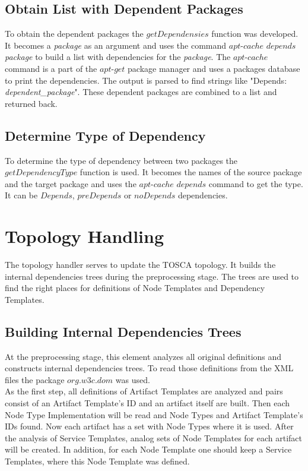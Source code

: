 \subsection*{Obtain List with Dependent Packages}
To obtain the dependent packages the $getDependensies$ function was developed.
It becomes a \emph{package} as an argument and uses the command $apt$-$cache$ $depends$ \emph{package} to build a list with dependencies for the \emph{package}. 
The $apt$-$cache$ command is a part of the $apt$-$get$ package manager and uses a packages database to print the dependencies.
The output is parsed to find strings like "Depends: \emph{dependent\_package}".
These dependent packages are combined to a list and returned back.

\subsection*{Determine Type of Dependency}
To determine the type of dependency between two packages the $getDependencyType$ function is used.
It becomes the names of the source package and the target package and uses the $apt$-$cache$ $depends$ command to get the type.
It can be $Depends$, $preDepends$ or $noDepends$ dependencies.

\section{Topology Handling}\label{sec:imptophan}
The topology handler serves to update the TOSCA topology.
It builds the internal dependencies trees during the preprocessing stage.
The trees are used to find the right places for definitions of Node Templates and Dependency Templates.

\subsection*{Building Internal Dependencies Trees}
At the preprocessing stage, this element analyzes all original definitions and constructs internal dependencies trees. %
To read those definitions from the XML files the package $org$.$w3c$.$dom$ was used.\\
As the first step, all definitions of Artifact Templates are analyzed and pairs consist of an Artifact Template's ID and an artifact itself are built.
Then each Node Type Implementation will be read and Node Types and Artifact Template's IDs found. 
Now each artifact has a set with Node Types where it is used.
After the analysis of Service Templates, analog sets of Node Templates for each artifact will be created. 
In addition, for each Node Template one should keep a Service Templates, where this Node Template was defined.	

